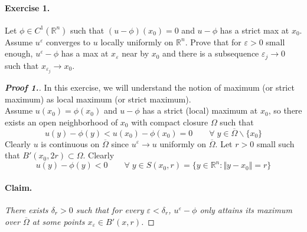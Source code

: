 \documentclass[12pt, oneside]{amsart}  	%
\begin{document}
\paragraph{\textbf{Exercise 1.}} Let $\phi\in  C^1(\mathbb{R}^n)$ such that $(u-\phi)(x_0) = 0$ and $u-\phi$ has a strict max at $x_0$. Assume $u^{\varepsilon}$ converges to $u$ locally uniformly on $\mathbb{R}^n$. Prove that for $\varepsilon>0$ small enough, $u^\varepsilon -\phi$ has a max at $x_\varepsilon$ near by $x_0$ and there is a subsequence $\varepsilon_j\longrightarrow 0$ such that $x_{\varepsilon_j}\longrightarrow x_0$.


\begin{proof}[\textbf{Proof 1.}] In this exercise, we will understand the notion of maximum (or strict maximum) as local maximum (or strict maximum).\\
Assume $u(x_0)=\phi(x_0)$ and $u - \phi$ has a strict (local) maximum at $x_0$, so there exists an open neighborhood of $x_0$ with compact closure $\Omega$ such that
\begin{equation*}
u(y) - \phi(y) < u(x_0) - \phi(x_0) = 0\qquad\forall\; y\in \overline{\Omega}\backslash \{x_0\}
\end{equation*}
Clearly $u$ is continuous on $\overline{\Omega}$ since $u^\varepsilon\longrightarrow u$ uniformly on $\overline{\Omega}$. Let $r>0$ small such that $B'(x_0,2r)\subset \Omega$. Clearly
\begin{equation*}
u(y) - \phi(y) < 0 \qquad\forall\;y\in S(x_0,r) = \{y\in \mathbb{R}^n:\Vert y-x_0\Vert = r\}  
\end{equation*}

\paragraph{\textbf{Claim.}}\textit{ There exists $\delta_r>0$ such that for every $\varepsilon <\delta_r$, $u^{\varepsilon} - \phi$ only attains its maximum over $\overline{\Omega}$ at some points $x_\varepsilon \in B'(x,r)$.}

\end{proof}
\end{document}
